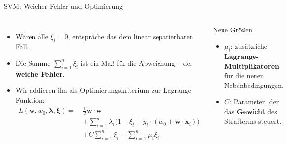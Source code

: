 \begin{frame}{SVM: Weicher Fehler und Optimierung}
\begin{columns}[T]
\begin{itemize}
  \item Wären alle $\xi_i = 0$, entspräche das dem linear separierbaren
        Fall.
  \item Die Summe $\sum_{i=1}^{n}\xi_i$ ist ein Maß für die Abweichung --
        der \textbf{weiche Fehler}.
  \item Wir addieren ihn als Optimierungskriterium zur Lagrange-Funktion:
        \[
          \begin{aligned}
          L(\mathbf{w}, w_0, \boldsymbol{\lambda}, \boldsymbol{\xi}) =\;
          &\tfrac{1}{2}\mathbf{w}\cdot\mathbf{w}\\
          &+ \sum_{i=1}^{n}\lambda_i\bigl(1 - \xi_i - y_i \cdot (w_0 + \mathbf{w}\cdot\mathbf{x}_i)\bigr)\\
          &+ C\sum_{i=1}^{n}\xi_i - \sum_{i=1}^{n}\mu_i \xi_i
          \end{aligned}
        \]
\end{itemize}

\begin{block}{\footnotesize Neue Größen}
    \footnotesize 
\begin{itemize}
  \item $\mu_i$: zusätzliche \textbf{Lagrange-Multiplikatoren} für die neuen
        Nebenbedingungen.
  \item $C$: Parameter, der das \textbf{Gewicht} des Strafterms steuert.
\end{itemize}
\end{block}
\end{columns}
\end{frame}

